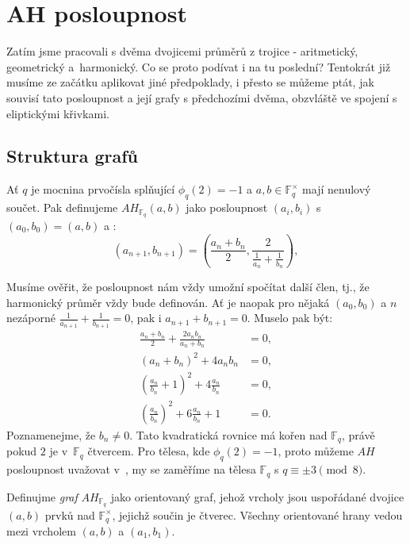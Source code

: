 \documentclass[12pt]{report}
\begin{document}
\chapter{AH posloupnost}
Zatím jsme pracovali s dvěma dvojicemi průměrů z trojice - aritmetický, geometrický a~harmonický. Co se proto podívat i na tu poslední? Tentokrát již musíme ze začátku aplikovat jiné předpoklady, i přesto se můžeme ptát, jak souvisí tato posloupnost a její grafy s předchozími dvěma, obzvláště ve spojení s eliptickými křivkami.

\section{Struktura grafů}

\begin{definice}
Ať $q$ je mocnina prvočísla splňující $\phi_q(2) = -1$ a $a,b \in \mathbb{F}_q ^{\times}$ mají nenulový součet. Pak definujeme $AH_{\mathbb{F}_q}(a,b)$ jako posloupnost $(a_i,b_i)$ s $(a_0,b_0) = (a,b)$ a :
\begin{equation*}
\left(a_{n+1},b_{n+1} \right) = \left(\frac{a_n+b_n}{2}, \frac{2}{\frac{1}{a_n} + \frac{1}{b_n}} \right),
\end{equation*}
\end{definice}
Musíme ověřit, že posloupnost nám vždy umožní spočítat další člen, tj., že harmonický průměr vždy bude definován. Ať je naopak pro nějaká $(a_0,b_0)$ a $n$ nezáporné $\frac{1}{a_{n+1}} + \frac{1}{b_{n+1}} = 0$, pak i $a_{n+1} + b_{n+1} = 0$. Muselo pak být:
\begin{align*}
\frac{a_n+b_n}{2} + \frac{2 a_n b_n}{a_n + b_n} &= 0,\\
(a_n+b_n)^2 + 4 a_n b_n &= 0,\\
\left(\frac{a_n}{b_n} + 1 \right)^2 + 4 \frac{a_n}{b_n} &= 0,\\
\left(\frac{a_n}{b_n}\right)^2 + 6 \frac{a_n}{b_n} + 1 &= 0.
\end{align*}
Poznamenejme, že $b_n \neq 0$. Tato kvadratická rovnice má kořen nad $\mathbb{F}_q$, právě pokud $2$ je v~$\mathbb{F}_q$ čtvercem. Pro tělesa, kde $\phi_q(2) = -1$, proto můžeme $AH$ posloupnost uvažovat v~, my se zaměříme na tělesa $\mathbb{F}_q$ s $q \equiv \pm 3 \pmod{8}$.

\begin{definice}
Definujme \textit{graf} $AH_{\mathbb{F}_q}$ jako orientovaný graf, jehož vrcholy jsou uspořádané dvojice $(a,b)$ prvků nad $\mathbb{F}_q ^{\times}$, jejichž součin je čtverec. Všechny orientované hrany vedou mezi vrcholem $(a,b)$ a $(a_1,b_1)$.
\end{definice}
\end{document}
